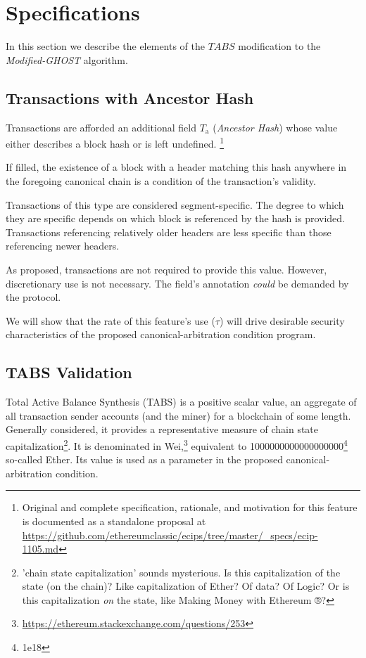\documentclass[11pt]{article}
\theoremstyle{plain}
\newcommand{\mghost}{\textit{Modified-GHOST }}
\begin{document}

\pagebreak
\section{\normalsize{Specifications}}

In this section we describe the elements of the $TABS$ modification to the
\mghost algorithm.

\subsection{\small{Transactions with Ancestor Hash}}

Transactions are afforded an additional field $T_\mathrm{a}$ (\textit{Ancestor
Hash}) whose value either describes a block hash or is left undefined.\nolinebreak
\footnote{Original and complete specification, rationale, and motivation for this feature is
documented as a standalone proposal at \url{https://github.com/ethereumclassic/ecips/tree/master/_specs/ecip-1105.md}}

If filled, the existence of a block with a header matching this hash anywhere
in the foregoing canonical chain is a condition of the transaction's validity.

Transactions of this type are considered segment-specific.
The degree to which they are specific depends on which block is referenced by the hash is provided.
Transactions referencing relatively older headers are less specific than those referencing newer headers.

As proposed, transactions are not required to provide this value.
However, discretionary use is not necessary.
The field's annotation \textit{could} be demanded by the protocol.

We will show that the rate of this feature's use ($\tau$) will drive desirable
security characteristics of the proposed canonical-arbitration condition program.


\subsection{\small{TABS Validation}}

Total Active Balance Synthesis (TABS) is a positive scalar value,
an aggregate of all transaction sender accounts (and the miner) for a blockchain of some length.
Generally considered, it provides a representative measure of chain state capitalization\footnote{
'chain state capitalization' sounds mysterious.
Is this capitalization of the state (on the chain)? Like capitalization of Ether? Of data? Of Logic?
Or is this capitalization \emph{on} the state, like Making Money with Ethereum ®?
}.
It is denominated in Wei,\footnote{\url{https://ethereum.stackexchange.com/questions/253}}
equivalent to 1000000000000000000\footnote{1e18} so-called Ether.
Its value is used as a parameter in the proposed canonical-arbitration condition.
\end{document}
